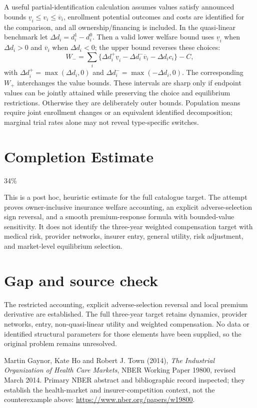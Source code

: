 \documentclass[11pt]{article}
\begin{document}
A useful partial-identification calculation assumes values satisfy announced bounds $\underline v_i\leq v_i\leq\overline v_i$, enrollment potential outcomes and costs are identified for the comparison, and all ownership/financing is included. In the quasi-linear benchmark let $\Delta d_i=d_i^1-d_i^0$. Then a valid lower welfare bound uses $\underline v_i$ when $\Delta d_i>0$ and $\overline v_i$ when $\Delta d_i<0$; the upper bound reverses these choices:
\[
 W_- =\sum_i\{\Delta d_i^+\underline v_i-\Delta d_i^-\overline v_i
                   -\Delta d_i c_i\}-C,
\]
with $\Delta d_i^+=\max(\Delta d_i,0)$ and $\Delta d_i^-=\max(-\Delta d_i,0)$. The corresponding $W_+$ interchanges the value bounds. These intervals are sharp only if endpoint values can be jointly attained while preserving the choice and equilibrium restrictions. Otherwise they are deliberately outer bounds. Population means require joint enrollment changes or an equivalent identified decomposition; marginal trial rates alone may not reveal type-specific switches.

\section{Completion Estimate}
34\%

This is a post hoc, heuristic estimate for the full catalogue target.
The attempt proves owner-inclusive insurance welfare accounting, an explicit adverse-selection sign reversal, and a smooth premium-response formula with bounded-value sensitivity. It does not identify the three-year weighted compensation target with medical risk, provider networks, insurer entry, general utility, risk adjustment, and market-level equilibrium selection.

\section{Gap and source check}
The restricted accounting, explicit adverse-selection reversal and local premium derivative are established. The full three-year target retains dynamics, provider networks, entry, non-quasi-linear utility and weighted compensation. No data or identified structural parameters for those elements have been supplied, so the original problem remains unresolved.

Martin Gaynor, Kate Ho and Robert J. Town (2014), \emph{The Industrial Organization of Health Care Markets}, NBER Working Paper 19800, revised March 2014. Primary NBER abstract and bibliographic record inspected; they establish the health-market and insurer-competition context, not the counterexample above:
\url{https://www.nber.org/papers/w19800}.
\end{document}

